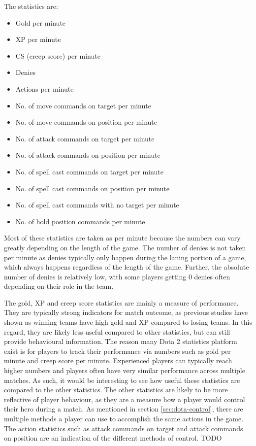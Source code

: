 \documentclass[Report.tex]{subfiles}
\begin{document}
The statistics are:
\begin{itemize}
\item Gold per minute
\item XP per minute
\item CS (creep score) per minute
\item Denies
\item Actions per minute
\item No. of move commands on target per minute
\item No. of move commands on position per minute
\item No. of attack commands on target per minute
\item No. of attack commands on position per minute
\item No. of spell cast commands on target per minute
\item No. of spell cast commands on position per minute
\item No. of spell cast commands with no target per minute
\item No. of hold position commands per minute
\end{itemize}
Most of these statistics are taken as per minute because the numbers can vary greatly depending on the length of the game. The number of denies is not taken per minute as denies typically only happen during the laning portion of a game, which always happens regardless of the length of the game. Further, the absolute number of denies is relatively low, with some players getting 0 denies often depending on their role in the team.

The gold, XP and creep score statistics are mainly a measure of performance. They are typically strong indicators for match outcome, as previous studies have shown \cite{dota-mixed-rank-win, dota-kinkade, dota-pu-yang, dota-yang} as winning teams have high gold and XP compared to losing teams. In this regard, they are likely less useful compared to other statistics, but can still provide behavioural information. The reason many Dota 2 statistics platform exist is for players to track their performance via numbers such as gold per minute and creep score per minute. Experienced players can typically reach higher numbers and players often have very similar performance across multiple matches. As such, it would be interesting to see how useful these statistics are compared to the other statistics. The other statistics are likely to be more reflective of player behaviour, as they are a measure how a player would control their hero during a match. As mentioned in section \ref{sec:dota-control}, there are multiple methods a player can use to accomplish the same actions in the game. The action statistics such as attack commands on target and attack commands on position are an indication of the different methods of control. TODO
\end{document}
